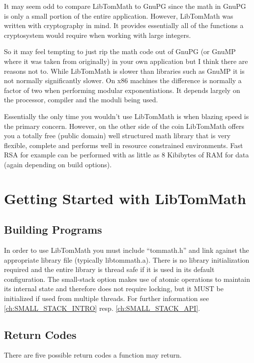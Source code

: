 \documentclass[synpaper]{book}
\begin{document}
It may seem odd to compare LibTomMath to GnuPG since the math in GnuPG is only a small portion of
the entire application. However, LibTomMath was written with cryptography in mind.  It provides
essentially all of the functions a cryptosystem would require when working with large integers.

So it may feel tempting to just rip the math code out of GnuPG (or GnuMP where it was taken from
originally) in your own application but I think there are reasons not to.  While LibTomMath is
slower than libraries such as GnuMP it is not normally significantly slower.  On x86 machines the
difference is normally a factor of two when performing modular exponentiations.  It depends largely
on the processor, compiler and the moduli being used.

Essentially the only time you wouldn't use LibTomMath is when blazing speed is the primary concern.
However, on the other side of the coin LibTomMath offers you a totally free (public domain) well
structured math library that is very flexible, complete and performs well in resource constrained
environments.  Fast RSA for example can be performed with as little as 8 Kibibytes of RAM for data
(again depending on build options).

\chapter{Getting Started with LibTomMath}
\section{Building Programs}
In order to use LibTomMath you must include ``tommath.h'' and link against the appropriate library
file (typically
libtommath.a).	There is no library initialization required and the entire library is thread safe
if it is used in its default configuration. The small-stack option makes use of atomic operations
to maintain its internal state and therefore does not require locking, but it MUST be initialized
if used from multiple threads. For further information see \ref{ch:SMALL_STACK_INTRO} resp.
\ref{ch:SMALL_STACK_API}.

\section{Return Codes}
There are five possible return codes a function may return.
\end{document}
